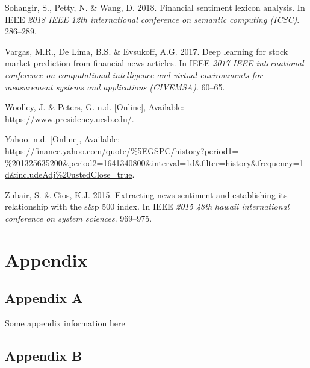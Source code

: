 \documentclass[11pt,preprint, authoryear]{elsarticle}
\numberwithin{equation}{section}
\numberwithin{figure}{section}
\numberwithin{table}{section}
\newlength{\cslhangindent}
\newenvironment{CSLReferences}%
  {\setlength{\parindent}{0pt}%
  \everypar{\setlength{\hangindent}{\cslhangindent}}\ignorespaces}%
  {\par}
\begin{document}
\begin{CSLReferences}{1}{0}
\leavevmode{}%
Sohangir, S., Petty, N. \& Wang, D. 2018. Financial sentiment lexicon
analysis. In IEEE \emph{2018 IEEE 12th international conference on
semantic computing (ICSC)}. 286--289.

\leavevmode{}%
Vargas, M.R., De Lima, B.S. \& Evsukoff, A.G. 2017. Deep learning for
stock market prediction from financial news articles. In IEEE \emph{2017
IEEE international conference on computational intelligence and virtual
environments for measurement systems and applications (CIVEMSA)}.
60--65.

\leavevmode{}%
Woolley, J. \& Peters, G. n.d. {[}Online{]}, Available:
\url{https://www.presidency.ucsb.edu/}.

\leavevmode{}%
Yahoo. n.d. {[}Online{]}, Available:
\url{https://finance.yahoo.com/quote/\%5EGSPC/history?period1=-\%201325635200\&period2=1641340800\&interval=1d\&filter=history\&frequency=1d\&includeAdj\%20ustedClose=true}.

\leavevmode{}%
Zubair, S. \& Cios, K.J. 2015. Extracting news sentiment and
establishing its relationship with the s\&p 500 index. In IEEE
\emph{2015 48th hawaii international conference on system sciences}.
969--975.

\end{CSLReferences}

\hypertarget{appendix}{%
\section*{Appendix}\label{appendix}}

\hypertarget{appendix-a}{%
\subsection*{Appendix A}\label{appendix-a}}

Some appendix information here

\hypertarget{appendix-b}{%
\subsection*{Appendix B}\label{appendix-b}}


\end{document}
